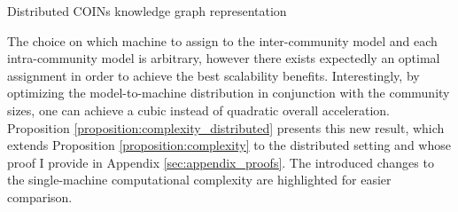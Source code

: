 \begin{algorithm}[H]
\caption{Distributed COINs knowledge graph representation}
\label{algorithm:coins_distributed}
\begin{algorithmic}[1]
\ELSE
{}
\ENDIF
{}
\end{algorithmic}
\end{algorithm} 

The choice on which machine to assign to the inter-community model and each intra-community model is arbitrary, however there exists expectedly an optimal assignment in order to achieve the best scalability benefits. Interestingly, by optimizing the model-to-machine distribution in conjunction with the community sizes, one can achieve a cubic instead of quadratic overall acceleration. Proposition \ref{proposition:complexity_distributed} presents this new result, which extends Proposition \ref{proposition:complexity} to the distributed setting and whose proof I provide in Appendix \ref{sec:appendix_proofs}. The introduced changes to the single-machine computational complexity are highlighted for easier comparison.

